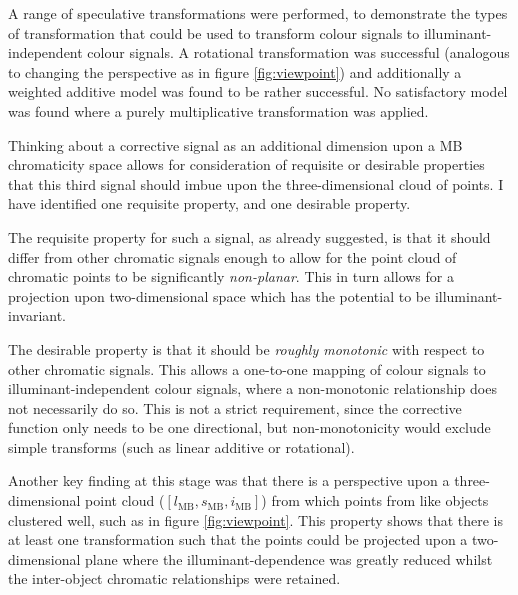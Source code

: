 A range of speculative transformations were performed, to demonstrate the types of transformation that could be used to transform colour signals to illuminant-independent colour signals. A rotational transformation was successful (analogous to changing the perspective as in figure \ref{fig:viewpoint}) and additionally a weighted additive model was found to be rather successful. No satisfactory model was found where a purely multiplicative transformation was applied.

Thinking about a corrective signal as an additional dimension upon a \gls{MB} chromaticity space allows for consideration of requisite or desirable properties that this third signal should imbue upon the three-dimensional cloud of points. I have identified one requisite property, and one desirable property. 

The requisite property for such a signal, as already suggested, is that it should differ from other chromatic signals enough to allow for the point cloud of chromatic points to be significantly \emph{non-planar}. This in turn allows for a projection upon two-dimensional space which has the potential to be illuminant-invariant.

The desirable property is that it should be \emph{roughly monotonic} with respect to other chromatic signals. This allows a one-to-one mapping of colour signals to illuminant-independent colour signals, where a non-monotonic relationship does not necessarily do so. This is not a strict requirement, since the corrective function only needs to be one directional, but non-monotonicity would exclude simple transforms (such as linear additive or rotational).

Another key finding at this stage was that there is a perspective upon a three-dimensional point cloud ($[l_{\text{MB}},s_{\text{MB}},i_{\text{MB}}]$) from which points from like objects clustered well, such as in figure \ref{fig:viewpoint}. This property shows that there is at least one transformation such that the points could be projected upon a two-dimensional plane where the illuminant-dependence was greatly reduced whilst the inter-object chromatic relationships were retained. 

